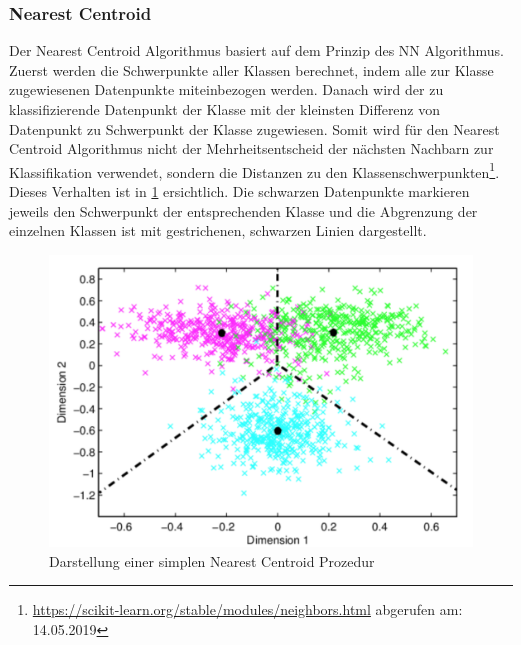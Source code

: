 \subsubsection{Nearest Centroid}
Der Nearest Centroid Algorithmus basiert auf dem Prinzip des NN Algorithmus.
Zuerst werden die Schwerpunkte aller Klassen berechnet, indem alle zur Klasse zugewiesenen Datenpunkte miteinbezogen werden.
Danach wird der zu klassifizierende Datenpunkt der Klasse mit der kleinsten Differenz von Datenpunkt zu Schwerpunkt der Klasse zugewiesen.
Somit wird für den Nearest Centroid Algorithmus nicht der Mehrheitsentscheid der nächsten Nachbarn zur Klassifikation verwendet, sondern die Distanzen zu den Klassenschwerpunkten\footnote{\url{https://scikit-learn.org/stable/modules/neighbors.html} abgerufen am: 14.05.2019}. \cite{scikit-learn}
Dieses Verhalten ist in \cref{fig:centroid} ersichtlich.
Die schwarzen Datenpunkte markieren jeweils den Schwerpunkt der entsprechenden Klasse und die Abgrenzung der einzelnen Klassen ist mit gestrichenen, schwarzen Linien dargestellt.
\begin{figure}[H]
	\centering	
	\includegraphics[width=0.7\columnwidth,keepaspectratio]{img/centroid.png}
	\caption{Darstellung einer simplen Nearest Centroid Prozedur}
	\label{fig:centroid}
\end{figure}
